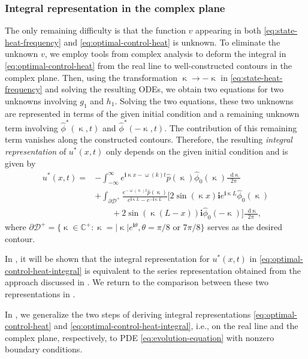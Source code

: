 \documentclass[journal,twoside,web]{ieeecolor}
\newcommand{\CC}{\mathbb{C}}
\newcommand{\D}{\mathcal{D}}
\newcommand{\state}{\phi}
\newcommand{\statehat}{\hat{\state}}
\newcommand{\im}{\mathbf{i}}
\newcommand*\diff{\mathop{}\!\mathrm{d}}
\newcommand{\abs}[1]{\left|#1\right|}
\newcommand{\wcomplex}{\upomega}
\newcommand{\kcomplex}{\upkappa}
\begin{document}
\subsubsection{Integral representation in the complex plane}
The only remaining difficulty is that the function $v$ appearing in both \eqref{eq:state-heat-frequency} and \eqref{eq:optimal-control-heat} is unknown.
To eliminate the unknown $v$, we employ tools from complex analysis to deform the integral in \eqref{eq:optimal-control-heat} from the real line to well-constructed contours in the complex plane. 
Then, using the transformation $\kcomplex\to-\kcomplex$ in \eqref{eq:state-heat-frequency} and solving the resulting ODEs, we obtain two equations for two unknowns involving $g_1$ and $h_1$. Solving the two equations, these two unknowns are represented in terms of the given initial condition and a remaining unknown term involving $\statehat^*(\kcomplex,t)$ and $\statehat^*(-\kcomplex,t)$. The contribution of this remaining term vanishes along the constructed contours.
Therefore, the resulting \emph{integral representation} of $u^*(x,t)$ only depends on the given initial condition and is given by
\begin{equation}\label{eq:optimal-control-heat-integral}
	\begin{split}
		u^*(x,t) = &-\int_{-\infty}^{\infty} e^{\im \kcomplex x-\wcomplex(k)t}\hat{p}(\kcomplex)\statehat_0(\kcomplex)\frac{\diff \kcomplex}{2\pi} \\
		& + \int_{\partial\D^+} \frac{e^{-\wcomplex(\kcomplex)t}\hat{p}(\kcomplex)}{e^{\im \kcomplex L} - e^{- \im \kcomplex L}} \big[2\sin(\kcomplex x)\im e^{\im\kcomplex L}\statehat_0(\kcomplex) \\
		 & \qquad + 2\sin(\kcomplex (L-x))\im\statehat_0(-\kcomplex) \big] \frac{\diff\kcomplex}{2\pi},
	\end{split}
\end{equation}
where $\partial \D^+=\{\kcomplex\in\CC^+:\kcomplex=\abs{\kcomplex}e^{\im \theta}, \theta = \pi/8 \text{ or }7\pi/8\}$ serves as the desired contour.

In , it will be shown that the integral representation for $u^*(x,t)$ in \eqref{eq:optimal-control-heat-integral} is equivalent to the series representation obtained from the approach discussed in .
We return to the comparison between these two representations in .

In , we generalize the two steps of deriving integral representations \eqref{eq:optimal-control-heat} and \eqref{eq:optimal-control-heat-integral}, i.e., on the real line and the complex plane, respectively, to PDE \eqref{eq:evolution-equation} with nonzero boundary conditions.
\end{document}
